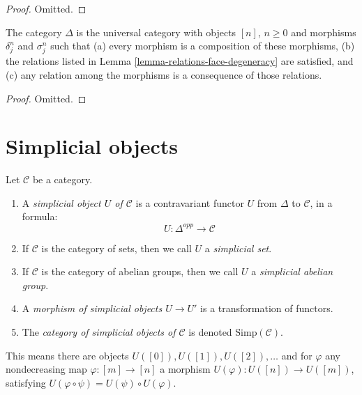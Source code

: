 \begin{proof}
Omitted.
\end{proof}

\begin{lemma}
\label{lemma-face-degeneracy-category}
The category $\Delta$ is the universal category
with objects $[n]$, $n \geq 0$ and morphisms
$\delta^n_j$ and $\sigma^n_j$ such that (a) every morphism is
a composition of these morphisms, (b) the relations
listed in Lemma \ref{lemma-relations-face-degeneracy} are satisfied,
and (c) any relation among the morphisms is a consequence of
those relations.
\end{lemma}

\begin{proof}
Omitted.
\end{proof}







\section{Simplicial objects}
\label{section-simplicial-object}

\begin{definition}
\label{definition-simplicial-object}
Let $\mathcal{C}$ be a category.
\begin{enumerate}
\item A {\it simplicial object $U$ of $\mathcal{C}$}
is a contravariant functor $U$ from $\Delta$ to
$\mathcal{C}$, in a formula:
$$
U : \Delta^{opp} \longrightarrow \mathcal{C}
$$
\item If $\mathcal{C}$ is the category of sets, then we call
$U$ a {\it simplicial set}.
\item If $\mathcal{C}$ is the category of abelian groups,
then we call $U$ a {\it simplicial abelian group}.
\item A {\it morphism of simplicial objects $U \to U'$}
is a transformation of functors.
\item The {\it category of simplicial objects of $\mathcal{C}$}
is denoted $\text{Simp}(\mathcal{C})$.
\end{enumerate}
\end{definition}

\noindent
This means there are objects $U([0]), U([1]), U([2]), \ldots$
and for $\varphi$ any nondecreasing map $\varphi : [m] \to [n]$
a morphism $U(\varphi) : U([n]) \to U([m])$, satisfying
$U(\varphi \circ \psi) = U(\psi) \circ U(\varphi)$.

